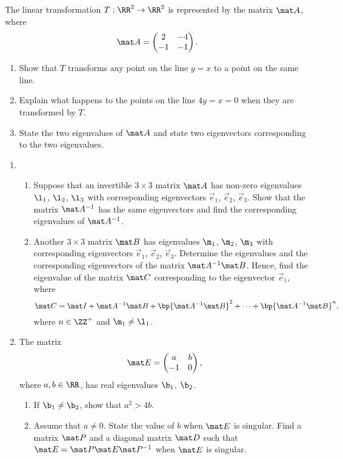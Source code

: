 \begin{problem}
    The linear transformation $T : \RR^2 \to \RR^2$ is represented by the matrix $\mat A$, where \[\mat A = \begin{pmatrix}2 & -4 \\ -1 & -1\end{pmatrix}.\]

    \begin{enumerate}
        \item Show that $T$ transforms any point on the line $y = x$ to a point on the same line.
        \item Explain what happens to the points on the line $4y = x = 0$ when they are transformed by $T$.
        \item State the two eigenvalues of $\mat A$ and state two eigenvectors corresponding to the two eigenvalues.
    \end{enumerate}
\end{problem}

\begin{problem}
    \begin{enumerate}
        \item \begin{enumerate}
            \item Suppose that an invertible $3 \times 3$ matrix $\mat A$ has non-zero eigenvalues $\l_1$, $\l_2$, $\l_3$ with corresponding eigenvectors $\vec e_1$, $\vec e_2$, $\vec e_3$. Show that the matrix $\mat A^{-1}$ has the same eigenvectors and find the corresponding eigenvalues of $\mat A^{-1}$.
            \item Another $3 \times 3$ matrix $\mat B$ has eigenvalues $\m_1$, $\m_2$, $\m_3$ with corresponding eigenvectors $\vec e_1$, $\vec e_2$, $\vec e_3$. Determine the eigenvalues and the corresponding eigenvectors of the matrix $\mat A^{-1} \mat B$. Hence, find the eigenvalue of the matrix $\mat C$ corresponding to the eigenvector $\vec e_1$, where \[\mat C = \mat I + \mat A^{-1} \mat B + \bp{\mat A^{-1} \mat B}^2 + \dots + \bp{\mat A^{-1} \mat B}^n,\] where $n \in \ZZ^+$ and $\m_1 \neq \l_1$.
        \end{enumerate}
        \item The matrix \[\mat E = \begin{pmatrix}a & b \\ -1 & 0\end{pmatrix},\] where $a, b \in \RR$, has real eigenvalues $\b_1$, $\b_2$.
        \begin{enumerate}
            \item If $\b_1 \neq \b_2$, show that $a^2 > 4b$.
            \item Assume that $a \neq 0$. State the value of $b$ when $\mat E$ is singular. Find a matrix $\mat P$ and a diagonal matrix $\mat D$ such that $\mat E = \mat P \mat E \mat P^{-1}$ when $\mat E$ is singular.
        \end{enumerate}
    \end{enumerate}
\end{problem}


